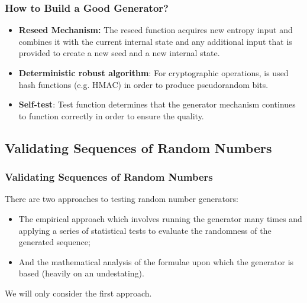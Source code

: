 \begin{frame}
    \frametitle{How to Build a Good Generator?}

    \begin{itemize}

        \item \textbf{Reseed Mechanism:} The reseed function acquires new entropy input and combines it with
        the current internal state and any additional input that is provided to create a new seed and a new
        internal state.
        
        \item \textbf{Deterministic robust algorithm}: For cryptographic operations, is used hash functions (e.g. HMAC) in order
        to produce pseudorandom bits.
        
        \item \textbf{Self-test}: Test function determines that the generator mechanism continues to 
        function correctly in order to ensure the quality.

    \end{itemize}
\end{frame}


\subsection{Validating Sequences of Random Numbers}

\begin{frame}
    \frametitle{Validating Sequences of Random Numbers}
    
    There are two approaches to testing random number generators:
    \begin{itemize}

        \item The empirical approach which involves running the generator many times and applying
        a series of statistical tests to evaluate the randomness of the generated sequence;

        \item And the mathematical analysis of the formulae upon which the generator is based (heavily on an undestating).

    \end{itemize}

    We will only consider the first approach.

\end{frame}



